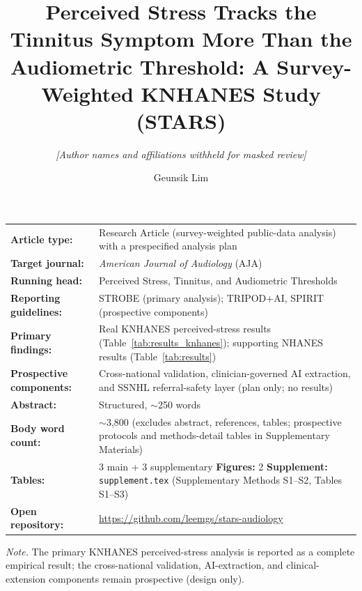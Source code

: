 \documentclass[12pt]{article}
\title{Perceived Stress Tracks the Tinnitus Symptom More Than the Audiometric Threshold: A Survey-Weighted KNHANES Study (STARS)}
\author{\normalsize\textit{[Author names and affiliations withheld for masked review]}}
\author[1]{Geunsik Lim}
\affil[1]{Sungkyunkwan University, Republic of Korea; \texttt{leemgs@g.skku.edu}}
\date{}
\newif\ifblind
\begin{document}
\maketitle
\thispagestyle{fancy}

\begin{center}
\small
\begin{tabular}{@{}l p{}@{}}
\textbf{Article type:} & Research Article (survey-weighted public-data analysis) with a prespecified analysis plan \\
\textbf{Target journal:} & \textit{American Journal of Audiology} (AJA) \\
\textbf{Running head:} & Perceived Stress, Tinnitus, and Audiometric Thresholds \\
\textbf{Reporting guidelines:} & STROBE (primary analysis); TRIPOD+AI, SPIRIT (prospective components) \\
\textbf{Primary findings:} & Real KNHANES perceived-stress results (Table~\ref{tab:results_knhanes}); supporting NHANES results (Table~\ref{tab:results}) \\
\textbf{Prospective components:} & Cross-national validation, clinician-governed AI extraction, and SSNHL referral-safety layer (plan only; no results) \\
\textbf{Abstract:} & Structured, $\sim$250 words \\
\textbf{Body word count:} & $\sim$3{,}800 (excludes abstract, references, tables; prospective protocols and methods-detail tables in Supplementary Materials) \\
\textbf{Tables:} & 3 main + 3 supplementary \qquad \textbf{Figures:} 2 \qquad \textbf{Supplement:} \texttt{supplement.tex} (Supplementary Methods S1--S2, Tables S1--S3) \\
\ifblind\textbf{Open repository:} & [URL withheld for masked review] \\\else\textbf{Open repository:} & \url{https://github.com/leemgs/stars-audiology} \\\fi
\end{tabular}

\vspace{2pt}
{\footnotesize\emph{Note.} The primary KNHANES perceived-stress analysis is reported as a complete empirical result; the cross-national validation, AI-extraction, and clinical-extension components remain prospective (design only).}
\end{center}












\end{document}
